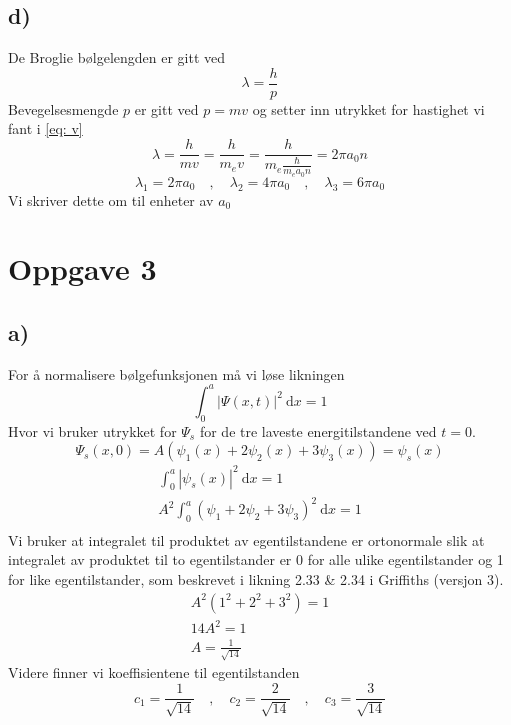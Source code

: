 \documentclass[norsk]{article}
\begin{document}
\subsection*{d)}
De Broglie bølgelengden er gitt ved 
\begin{equation}
λ = \frac{h}{p}
\end{equation}
Bevegelsesmengde $p$ er gitt ved $p = mv$ og setter inn utrykket for hastighet vi fant i \cref{eq: v}
\begin{equation}
λ = \frac{h}{mv} = \frac{h}{m_e v} = \frac{h}{m_e \frac{ℏ}{m_e a_0 n}} = 2π a_0n
\end{equation}
\begin{equation}
λ_1 = 2πa_0 \quad , \quad λ_2 = 4πa_0 \quad , \quad λ_3 = 6πa_0
\end{equation}
Vi skriver dette om til enheter av $a_0$

\section*{Oppgave 3}
\subsection*{a)}
For å normalisere bølgefunksjonen må vi løse likningen 
\begin{equation}
\int_{0}^{a} \left|Ψ(x,t)\right|^2 \ \mathrm{d}x = 1
\end{equation}
Hvor vi bruker utrykket for $Ψ_s$ for de tre laveste energitilstandene ved $t=0$. 
\begin{equation}\label{eq: Psi_s}
    Ψ_s(x,0) = A \left(ψ_1 (x) + 2ψ_2(x) + 3ψ_3(x)\right) = ψ_s(x)
\end{equation}
\begin{align}
    ∫_{0}^{a} \left|ψ_s(x)\right|^2 \ \mathrm{d}x = 1 \\
    A^2 ∫_{0}^{a} \left(ψ_1 + 2ψ_2 + 3 ψ_3\right)^2 \ \mathrm{d}x = 1 \\
\end{align}
Vi bruker at integralet til produktet av egentilstandene er ortonormale slik at integralet av produktet til to egentilstander er 0 for alle ulike egentilstander og 1 for like egentilstander, som beskrevet i likning 2.33 \& 2.34 i Griffiths (versjon 3).
\begin{align}
    A^2 \left(1^2 + 2^2 + 3^2\right)  = 1 \\ 
    14A^2 = 1 \\
    A = \frac{1}{\sqrt{14}}
\end{align}
Videre finner vi koeffisientene til egentilstanden 
\begin{equation}\label{eq: c_n}
  c_1 = \frac{1}{\sqrt{14}} \quad , \quad c_2 = \frac{2}{\sqrt{14}} \quad , \quad c_3 = \frac{3}{\sqrt{14}}
\end{equation}
\end{document}
